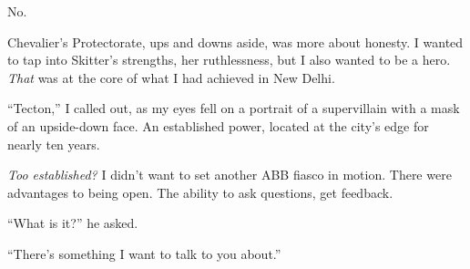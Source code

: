No.



Chevalier's Protectorate, ups and downs aside, was more about honesty.  I wanted to tap into Skitter's strengths, her ruthlessness, but I also wanted to be a hero.  \emph{That} was at the core of what I had achieved in New Delhi.



``Tecton,'' I called out, as my eyes fell on a portrait of a supervillain with a mask of an upside-down face.  An established power, located at the city's edge for nearly ten years.



\emph{Too established?  }I didn't want to set another ABB fiasco in motion.  There were advantages to being open.  The ability to ask questions, get feedback.



``What is it?'' he asked.



``There's something I want to talk to you about.''






